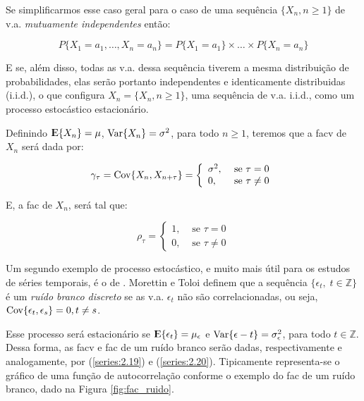 Se simplificarmos esse caso geral para o caso de uma sequência $\{ X_n , n \geq 1 \}$ de v.a. \emph{mutuamente independentes} então:

\[ P\{X_1 = a_1, \ldots, X_n = a_n\} = P\{X_1 = a_1\}\times\ldots\times P\{X_n = a_n\} \]

E se, além disso, todas as v.a. dessa sequência tiverem a mesma distribuição de probabilidades, elas serão portanto independentes e identicamente distribuidas (i.i.d.), o que configura $X_n = \{ X_n , n \geq 1 \}$, uma sequência de v.a. i.i.d., como um processo estocástico estacionário.

Definindo ${\rm I\kern-.3em E}\{X_n\} = \mu$, $\mathrm{Var}\{X_n\} = \sigma^2$, para todo $n \geq 1$, teremos que a facv de $X_n$ será dada por:

\begin{equation}\label{series:2.19}
\gamma_\tau = \mathrm{Cov}\{X_n, X_{n+\tau}\} = \left\{\begin{array}{lr} \sigma^2, & \text{ se } \tau = 0 \\ 0, & \text{ se } \tau \neq 0 \end{array}\right.
\end{equation}

E, a fac de $X_n$, será tal que:

\begin{equation}\label{series:2.20}
\rho_\tau = \left\{\begin{array}{lr} 1, & \text{ se } \tau = 0 \\ 0, & \text{ se } \tau \neq 0 \end{array}\right.
\end{equation}

Um segundo exemplo de processo estocástico, e muito mais útil para os estudos de séries temporais, é o de . Morettin e Toloi \citep{morettin} definem que a sequência $\{\epsilon_t,\; t \in \mathbb{Z}\}$ é um \emph{ruído branco discreto} se as v.a. $\epsilon_t$ não são correlacionadas, ou seja, $\mathrm{Cov}\{\epsilon_t, \epsilon_s\} = 0, t \neq s$.

Esse processo será estacionário se ${\rm I\kern-.3em E}\{\epsilon_t\} = \mu_\epsilon$ e $\mathrm{Var}\{\epsilon-t\} = \sigma_\epsilon^2$, para todo $t \in \mathbb{Z}$. Dessa forma, as facv e fac de um ruído branco serão dadas, respectivamente e analogamente, por (\ref{series:2.19}) e (\ref{series:2.20}). Tipicamente representa-se o gráfico de uma função de autocorrelação conforme o exemplo do fac de um ruído branco, dado na Figura \ref{fig:fac_ruido}.

